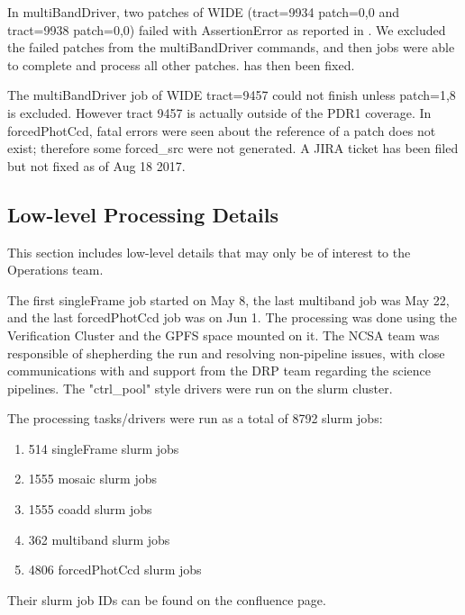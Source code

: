 \documentclass[DM,authoryear,toc]{lsstdoc}
\begin{document}
In multiBandDriver, two patches of WIDE (tract=9934 patch=0,0  and  tract=9938 patch=0,0) failed with AssertionError as reported in . We excluded the failed patches from the multiBandDriver commands, and then jobs were able to complete and process all other patches.  has then been fixed.

The multiBandDriver job of WIDE tract=9457 could not finish unless patch=1,8 is excluded. However tract 9457 is actually outside of the PDR1 coverage.
In forcedPhotCcd, fatal errors were seen about the reference of a patch does not exist; therefore some forced{\_}src were not generated. A JIRA ticket  has been filed but not fixed as of Aug 18 2017.

\subsection{Low-level Processing Details}

This section includes low-level details that may only be of interest to the Operations team.

The first singleFrame job started on May 8, the last multiband job was May 22, and the last forcedPhotCcd job was on Jun 1.  The processing was done using the Verification Cluster and the GPFS space mounted on it. The NCSA team was responsible of shepherding the run and resolving non-pipeline issues, with close communications with and support from the DRP team regarding the science pipelines.  The "ctrl{\_}pool" style drivers were run on the slurm cluster.

The processing tasks/drivers were run as a total of 8792 slurm jobs:
\begin{enumerate}
\item
514 singleFrame slurm jobs
\item
1555 mosaic slurm jobs
\item
1555 coadd slurm jobs
\item
362 multiband slurm jobs
\item
4806 forcedPhotCcd slurm jobs
\end{enumerate}
Their slurm job IDs can be found on the confluence page.
\end{document}
